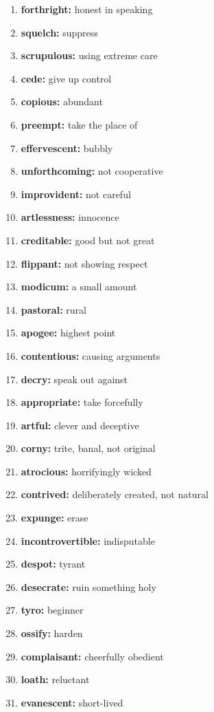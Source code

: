 \documentclass{article}
\begin{document}
\begin{enumerate}
    \item \textbf{forthright: }{honest in speaking}
    \item \textbf{squelch: }{suppress}
    \item \textbf{scrupulous: }{using extreme care}
    \item \textbf{cede: }{give up control}
    \item \textbf{copious: }{abundant}
    \item \textbf{preempt: }{take the place of}
    \item \textbf{effervescent: }{bubbly}
    \item \textbf{unforthcoming: }{not cooperative}
    \item \textbf{improvident: }{not careful}
    \item \textbf{artlessness: }{innocence}
    \item \textbf{creditable: }{good but not great}
    \item \textbf{flippant: }{not showing respect}
    \item \textbf{modicum: }{a small amount}
    \item \textbf{pastoral: }{rural}
    \item \textbf{apogee: }{highest point}
    \item \textbf{contentious: }{causing arguments}
    \item \textbf{decry: }{speak out against}
    \item \textbf{appropriate: }{take forcefully}
    \item \textbf{artful: }{clever and deceptive}
    \item \textbf{corny: }{trite, banal, not original}
    \item \textbf{atrocious: }{horrifyingly wicked}
    \item \textbf{contrived: }{deliberately created, not natural}
    \item \textbf{expunge: }{erase}
    \item \textbf{incontrovertible: }{indisputable}
    \item \textbf{despot: }{tyrant}
    \item \textbf{desecrate: }{ruin something holy}
    \item \textbf{tyro: }{beginner}
    \item \textbf{ossify: }{harden}
    \item \textbf{complaisant: }{cheerfully obedient}
    \item \textbf{loath: }{reluctant}
    \item \textbf{evanescent: }{short-lived}

\end{enumerate}
\end{document}
